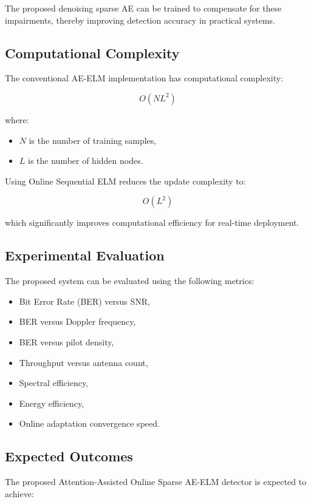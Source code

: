 \documentclass[10pt, conference]{IEEEtran}
\begin{document}
The proposed denoising sparse AE can be trained to compensate for these impairments, thereby improving detection accuracy in practical systems.

\subsection{Computational Complexity}

The conventional AE-ELM implementation has computational complexity:

\[
O(NL^2)
\]

where:
\begin{itemize}
    \item $N$ is the number of training samples,
    \item $L$ is the number of hidden nodes.
\end{itemize}

Using Online Sequential ELM reduces the update complexity to:

\[
O(L^2)
\]

which significantly improves computational efficiency for real-time deployment.

\subsection{Experimental Evaluation}

The proposed system can be evaluated using the following metrics:

\begin{itemize}
    \item Bit Error Rate (BER) versus SNR,
    \item BER versus Doppler frequency,
    \item BER versus pilot density,
    \item Throughput versus antenna count,
    \item Spectral efficiency,
    \item Energy efficiency,
    \item Online adaptation convergence speed.
\end{itemize}

\subsection{Expected Outcomes}

The proposed Attention-Assisted Online Sparse AE-ELM detector is expected to achieve:
\end{document}
